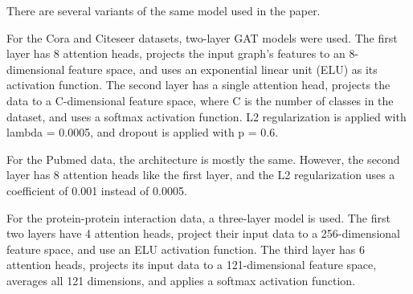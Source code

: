 There are several variants of the same model used in the paper.

For the Cora and Citeseer datasets, two-layer GAT models were used.
The first layer has 8 attention heads, projects the input graph's features to an
8-dimensional feature space, and uses an exponential linear unit (ELU) as its
activation function.
The second layer has a single attention head, projects the data to a C-dimensional feature space, where C is the number of classes in
the dataset, and uses a softmax activation function.
L2 regularization is applied with lambda = 0.0005, and dropout is applied with p = 0.6.

For the Pubmed data, the architecture is mostly the same. However, the second
layer has 8 attention heads like the first layer, and the L2 regularization
uses a coefficient of 0.001 instead of 0.0005.

For the protein-protein interaction data, a three-layer model is used. The
first two layers have 4 attention heads, project their input data to a
256-dimensional feature space, and use an ELU activation function. The third
layer has 6 attention heads, projects its input data to a 121-dimensional
feature space, averages all 121 dimensions, and applies a softmax activation
function.
